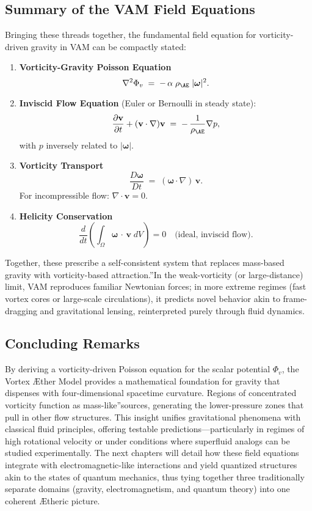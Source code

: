 \subsection{Summary of the VAM Field Equations}

Bringing these threads together, the fundamental field equation for vorticity-driven gravity in VAM can be compactly stated:

\begin{enumerate}
    \item \textbf{Vorticity-Gravity Poisson Equation}
    \[
        \nabla^2 \Phi_v \;=\; -\,\alpha\;\rho_{\mathrm{\AE}}\;\lvert \boldsymbol{\omega} \rvert^2.
    \]

    \item \textbf{Inviscid Flow Equation} (Euler or Bernoulli in steady state):
    \[
        \frac{\partial \mathbf{v}}{\partial t} + (\mathbf{v}\cdot\nabla)\mathbf{v} \;=\; -\,\frac{1}{\rho_{\mathrm{\AE}}}\nabla p,
    \]
    with \(p\) inversely related to \(\lvert \boldsymbol{\omega} \rvert\).

    \item \textbf{Vorticity Transport}
    \[
        \frac{D \boldsymbol{\omega}}{Dt} \;=\;  (\boldsymbol{\omega} \cdot \nabla)\,\mathbf{v}.
    \]
    For incompressible flow: \(\nabla \cdot \mathbf{v} = 0\).

    \item \textbf{Helicity Conservation}
    \[
        \frac{d}{dt}  \left( \int_{\Omega} \boldsymbol{\omega}\,\cdot\,\mathbf{v}\; dV \right) = 0  \quad \text{(ideal, inviscid flow)}.
    \]
\end{enumerate}

Together, these prescribe a self-consistent system that replaces mass-based gravity with vorticity-based \grqq attraction.\textquotedblright In the weak-vorticity (or large-distance) limit, VAM reproduces familiar Newtonian forces; in more extreme regimes (fast vortex cores or large-scale circulations), it predicts novel behavior akin to frame-dragging and gravitational lensing, reinterpreted purely through fluid dynamics.

\subsection{Concluding Remarks}

By deriving a vorticity-driven Poisson equation for the scalar potential \(\Phi_v\), the Vortex Æther Model provides a mathematical foundation for gravity that dispenses with four-dimensional spacetime curvature. Regions of concentrated vorticity function as \grqq mass-like\textquotedblright sources, generating the lower-pressure zones that pull in other flow structures. This insight unifies gravitational phenomena with classical fluid principles, offering testable predictions—particularly in regimes of high rotational velocity or under conditions where superfluid analogs can be studied experimentally. The next chapters will detail how these field equations integrate with electromagnetic-like interactions and yield quantized structures akin to the states of quantum mechanics, thus tying together three traditionally separate domains (gravity, electromagnetism, and quantum theory) into one coherent Ætheric picture.


